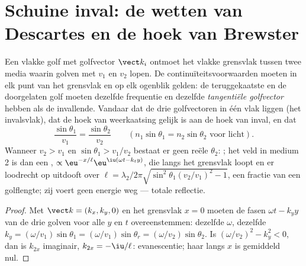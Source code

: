 \section{Schuine inval: de wetten van Descartes en de hoek van Brewster}

\begin{theorem}\label{thm:b2:wave-interfaces:snell}
Een vlakke golf met golfvector $\vect k_i$ ontmoet het vlakke grensvlak
tussen twee media waarin golven met $v_1$ en $v_2$ lopen. De
continuïteitsvoorwaarden moeten in elk punt van het grensvlak en op elk
ogenblik gelden: de teruggekaatste en de doorgelaten golf moeten dezelfde
frequentie en dezelfde \emph{tangentiële golfvector} hebben als de
invallende. Vandaar dat de drie golfvectoren in één vlak liggen (het
invalsvlak), dat de hoek van weerkaatsing gelijk is aan de hoek van inval,
en dat
\[
\frac{\sin\theta_1}{v_1} = \frac{\sin\theta_2}{v_2} \qquad (n_1\sin\theta_1 = n_2\sin\theta_2 \text{ voor licht}) .
\]
Wanneer $v_2 > v_1$ en $\sin\theta_1 > v_1/v_2$ bestaat er geen reële
$\theta_2$: \emph{}; het veld in medium 2 is dan
een \emph{},
$\propto\eu^{-x/\ell}\eu^{\iu(\omega t - k_ty)}$, die langs het grensvlak
loopt en er loodrecht op uitdooft over
$\ell = \lambda_2/2\pi
\sqrt{\sin^2\theta_1(v_2/v_1)^2 - 1}$, een fractie
van een golflengte; zij voert geen energie weg --- totale reflectie.
\end{theorem}

\begin{proof}
Met $\vect k = (k_x, k_y, 0)$ en het grensvlak $x = 0$ moeten de fasen
$\omega t - k_yy$ van de drie golven voor alle $y$ en $t$ overeenstemmen:
dezelfde $\omega$, dezelfde
$k_y = (\omega/v_1)\sin\theta_1 = (\omega/v_1)\sin\theta_r = (\omega/v_2)\sin
\theta_2$.
Is $(\omega/v_2)^2 - k_y^2 < 0$, dan is $k_{2x}$ imaginair,
$k_{2x} = -\iu/\ell$: evanescentie; haar  langs $x$ is
gemiddeld nul.
\end{proof}

